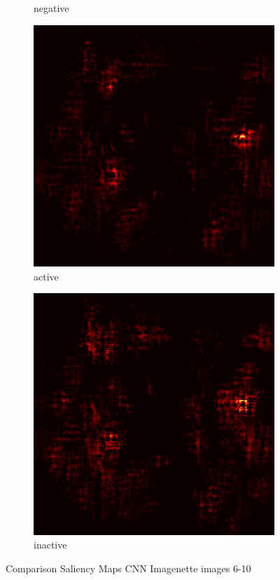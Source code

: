 \documentclass[preprint,12pt]{elsarticle}
\begin{document}
\begin{figure}
\begin{subfigure}{0.14\textwidth}
        \caption{negative}
    \end{subfigure}
    \hfill
    \begin{subfigure}{0.14\textwidth}
        \centering
        \includegraphics[width=\linewidth]{../visualizations/examples/imagenette/cnn/active_saliency_map/9.png}
        \caption{active}
    \end{subfigure}
    \hfill
    \begin{subfigure}{0.14\textwidth}
        \centering
        \includegraphics[width=\linewidth]{../visualizations/examples/imagenette/cnn/inactive_saliency_map/9.png}
        \caption{inactive}
    \end{subfigure}
    \hfill
    \caption{Comparison Saliency Maps CNN Imagenette images 6-10}
\end{figure}
\end{document}

